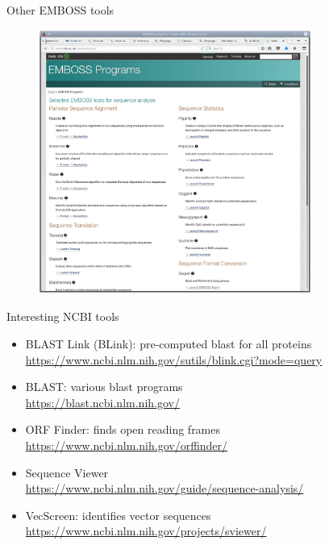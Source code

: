 \documentclass[pdf]{beamer}
\begin{document}
\begin{frame}{Other EMBOSS tools}
  \begin{figure}[ht]
    \includegraphics[width=0.8\textwidth]{images/emboss_tools}
  \end{figure}

\end{frame}

\begin{frame}{Interesting NCBI tools}
  \begin{itemize}
    \item BLAST Link (BLink): pre-computed blast for all proteins\\
      \url{https://www.ncbi.nlm.nih.gov/sutils/blink.cgi?mode=query}
    \item BLAST: various blast programs\\
      \url{https://blast.ncbi.nlm.nih.gov/}
    \item ORF Finder: finds open reading frames\\
      \url{https://www.ncbi.nlm.nih.gov/orffinder/}
    \item Sequence Viewer\\
      \url{https://www.ncbi.nlm.nih.gov/guide/sequence-analysis/}
    \item VecScreen: identifies vector sequences
      \url{https://www.ncbi.nlm.nih.gov/projects/sviewer/}  
  \end{itemize}
\end{frame}
\end{document}

